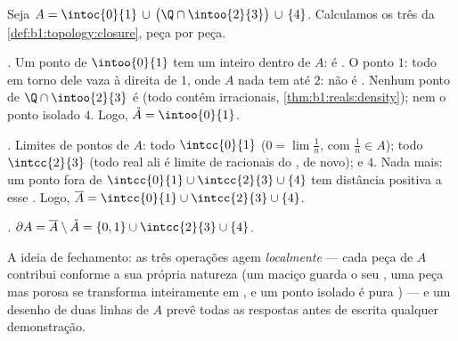 \begin{example}\label{ex:b1:topology:anatomy}
Seja $A = \intoc{0}{1} \,\cup\, \bigl(\Q \cap \intoo{2}{3}\bigr)
\,\cup\, \{4\}$. Calculamos os três  da
\cref{def:b1:topology:closure}, peça por peça.

\emph{.} Um ponto de $\intoo{0}{1}$ tem um  inteiro
dentro de $A$: é . O ponto $1$: todo  em torno dele
vaza à direita de $1$, onde $A$ nada tem até $2$: não é
. Nenhum ponto de $\Q \cap \intoo{2}{3}$ é  (todo
 contém irracionais, \cref{thm:b1:reals:density});
nem o ponto isolado $4$. Logo, $\mathring A = \intoo{0}{1}$.

\emph{.} Limites de pontos de $A$: todo $\intcc{0}{1}$
($0 = \lim \frac1n$, com $\frac 1n \in A$); todo
$\intcc{2}{3}$ (todo real ali é limite de racionais do
,  de novo); e $4$. Nada mais: um ponto
fora de $\intcc{0}{1} \cup \intcc{2}{3} \cup \{4\}$ tem distância positiva a
esse . Logo, $\overline A = \intcc{0}{1} \cup
\intcc{2}{3} \cup \{4\}$.

\emph{.} $\partial A = \overline A \setminus \mathring A
= \{0, 1\} \cup \intcc{2}{3} \cup \{4\}$.

A ideia de fechamento: as três operações agem \emph{localmente} ---
cada peça de $A$ contribui conforme a sua própria natureza (um
 maciço guarda o seu , uma peça  mas porosa se
transforma inteiramente em , e um ponto isolado é pura
) --- e um desenho de duas linhas de $A$ prevê todas as
respostas antes de escrita qualquer demonstração.
\end{example}

